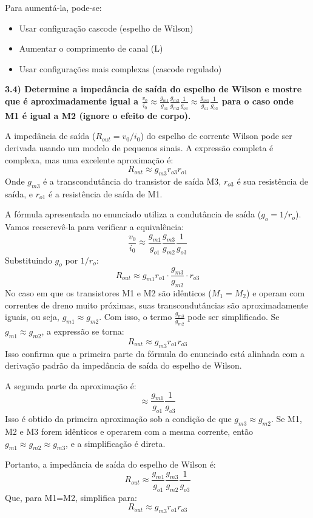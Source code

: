 ﻿\documentclass[12pt,a4paper]{article}
\begin{document}
Para aumentá-la, pode-se:
\begin{itemize}
    \item Usar configuração cascode (espelho de Wilson)
    \item Aumentar o comprimento de canal (L)
    \item Usar configurações mais complexas (cascode regulado)
\end{itemize}

\textbf{3.4) Determine a impedância de saída do espelho de Wilson e mostre que é aproximadamente igual a $\frac{v_{0}}{i_{0}} \approx \frac{g_{m1}}{g_{o1}} \frac{g_{m3}}{g_{m2}} \frac{1}{g_{o3}} \approx \frac{g_{m1}}{g_{o1}} \frac{1}{g_{o3}}$ para o caso onde M1 é igual a M2 (ignore o efeito de corpo).}



A impedância de saída ($R_{out} = v_0/i_0$) do espelho de corrente Wilson pode ser derivada usando um modelo de pequenos sinais. A expressão completa é complexa, mas uma excelente aproximação é:
$$ R_{out} \approx g_{m3}r_{o3}r_{o1} $$
Onde $g_{m3}$ é a transcondutância do transistor de saída M3, $r_{o3}$ é sua resistência de saída, e $r_{o1}$ é a resistência de saída de M1.

A fórmula apresentada no enunciado utiliza a condutância de saída ($g_o = 1/r_o$). Vamos reescrevê-la para verificar a equivalência:
$$ \frac{v_{0}}{i_{0}} \approx \frac{g_{m1}}{g_{o1}} \frac{g_{m3}}{g_{m2}} \frac{1}{g_{o3}} $$
Substituindo $g_o$ por $1/r_o$:
$$ R_{out} \approx g_{m1} r_{o1} \cdot \frac{g_{m3}}{g_{m2}} \cdot r_{o3} $$
No caso em que os transistores M1 e M2 são idênticos ($M_1 = M_2$) e operam com correntes de dreno muito próximas, suas transcondutâncias são aproximadamente iguais, ou seja, $g_{m1} \approx g_{m2}$. Com isso, o termo $\frac{g_{m3}}{g_{m2}}$ pode ser simplificado. Se $g_{m1} \approx g_{m2}$, a expressão se torna:
$$ R_{out} \approx g_{m3} r_{o1} r_{o3} $$
Isso confirma que a primeira parte da fórmula do enunciado está alinhada com a derivação padrão da impedância de saída do espelho de Wilson.

A segunda parte da aproximação é:
$$ \approx \frac{g_{m1}}{g_{o1}} \frac{1}{g_{o3}} $$
Isso é obtido da primeira aproximação sob a condição de que $g_{m3} \approx g_{m2}$. Se M1, M2 e M3 forem idênticos e operarem com a mesma corrente, então $g_{m1} \approx g_{m2} \approx g_{m3}$, e a simplificação é direta.

Portanto, a impedância de saída do espelho de Wilson é:
$$ \boxed{R_{out} \approx \frac{g_{m1}}{g_{o1}} \frac{g_{m3}}{g_{m2}} \frac{1}{g_{o3}}} $$
Que, para M1=M2, simplifica para:
$$ \boxed{R_{out} \approx g_{m3}r_{o1}r_{o3}} $$
\end{document}
